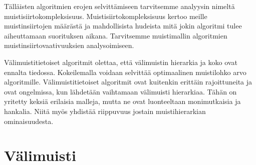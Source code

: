 \documentclass[finnish]{tktltiki2}
\theoremstyle{definition}
\theoremstyle{remark}
\begin{document}
Tälläisten algoritmien erojen selvittämiseen tarvitsemme analyysin
nimeltä muistisiirtokompleksisuus. %
Muistisiirtokompleksisuus kertoo meille muistinsiirtojen määrästä ja
mahdollisista hudeista mitä jokin algoritmi tulee aiheuttamaan suorituksen
aikana. Tarvitsemme muistimallin algoritmien muistinsiirtovaativuuksien analysoimiseen.

Välimuistitietoiset algoritmit olettaa,
että välimuistin hierarkia ja koko ovat ennalta tiedossa. Kokeilemalla voidaan
selvittää optimaalinen muistilohko arvo algoritmille. Välimuistitietoiset
algoritmit ovat kuitenkin erittäin rajoittuneita ja ovat ongelmissa, kun
lähdetään vaihtamaan välimuisti hierarkiaa. Tähän on yritetty keksiä
erilaisia malleja, mutta ne ovat luonteeltaan monimutkaisia ja hankalia. Niitä
myös yhdistää riippuvuus jostain muistihierarkian ominaisuudesta.
%


\section{Välimuisti}
\end{document}
